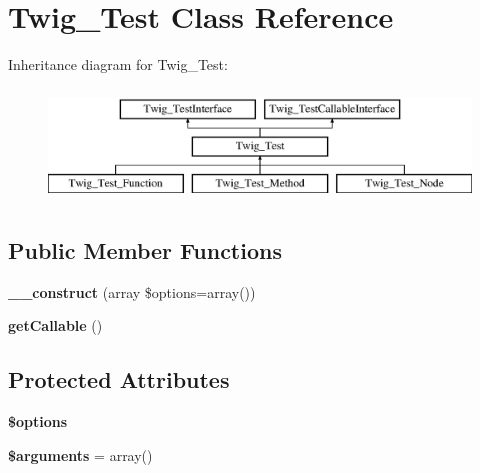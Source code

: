 \hypertarget{class_twig___test}{}\section{Twig\+\_\+\+Test Class Reference}
\label{class_twig___test}
Inheritance diagram for Twig\+\_\+\+Test\+:\begin{figure}[H]
\begin{center}
\leavevmode
\includegraphics[height=3.000000cm]{class_twig___test}
\end{center}
\end{figure}
\subsection*{Public Member Functions}
\begin{DoxyCompactItemize}
\item 
\hypertarget{class_twig___test_a2d2b2afcd896367c740d1eb4b486614b}{}{\bfseries \+\_\+\+\_\+construct} (array \$options=array())\label{class_twig___test_a2d2b2afcd896367c740d1eb4b486614b}

\item 
\hypertarget{class_twig___test_a0be839e0782a38a172c386bd963375c9}{}{\bfseries get\+Callable} ()\label{class_twig___test_a0be839e0782a38a172c386bd963375c9}

\end{DoxyCompactItemize}
\subsection*{Protected Attributes}
\begin{DoxyCompactItemize}
\item 
\hypertarget{class_twig___test_a011800c63ece4cbbfa77136a20607023}{}{\bfseries \$options}\label{class_twig___test_a011800c63ece4cbbfa77136a20607023}

\item 
\hypertarget{class_twig___test_a61eded163d962fc248b3cf209000979b}{}{\bfseries \$arguments} = array()\label{class_twig___test_a61eded163d962fc248b3cf209000979b}

\end{DoxyCompactItemize}


